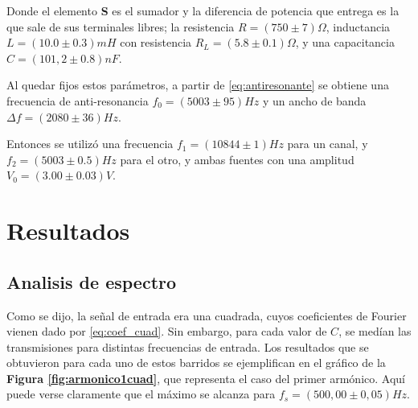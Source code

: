 \documentclass[11pt,a4paper]{article}
\begin{document}
Donde el elemento \textbf{S} es el sumador y la diferencia de potencia que entrega es la que sale de sus terminales libres; la resistencia $R=(750 \pm 7)\Omega$, inductancia $L=(10.0 \pm 0.3)mH$ con resistencia $R_L =(5.8 \pm 0.1)\Omega$, y una capacitancia $C=(101,2 \pm 0.8)nF$.

Al quedar fijos estos parámetros, a partir de \eqref{eq:antiresonante} se obtiene una frecuencia de anti-resonancia $f_0 = (5003 \pm 95)Hz$ y un ancho de banda $\Delta f = (2080 \pm 36)Hz$.

Entonces se utilizó una frecuencia $f_1=(10844 \pm 1)Hz$ para un canal, y $f_2=(5003\pm 0.5)Hz$ para el otro, y ambas fuentes con una amplitud $V_0=(3.00 \pm 0.03)V$.




\section{Resultados}
\label{sec:discusion}

\subsection{Analisis de espectro}
Como se dijo, la señal de entrada era una cuadrada, cuyos coeficientes de Fourier vienen dado por \eqref{eq:coef_cuad}. Sin embargo, para cada valor de $C$, se medían las transmisiones para distintas frecuencias de entrada. Los resultados que se obtuvieron para cada uno de estos barridos se ejemplifican en el gráfico de la \textbf{Figura \ref{fig:armonico1cuad}}, que representa el caso del primer armónico. Aquí puede verse claramente que el máximo se alcanza para $f_s = (500,00 \pm 0,05)Hz$.
\end{document}
